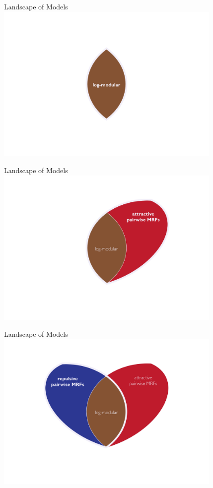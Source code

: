\begin{frame}{Landscape of Models}
\centering
\includegraphics[width=4.3in]{figures/venn01.pdf}
\end{frame}

\begin{frame}{Landscape of Models}
\centering
\includegraphics[width=4.3in]{figures/venn02.pdf}
\end{frame}

\begin{frame}{Landscape of Models}
\centering
\includegraphics[width=4.3in]{figures/venn03.pdf}
\end{frame}

